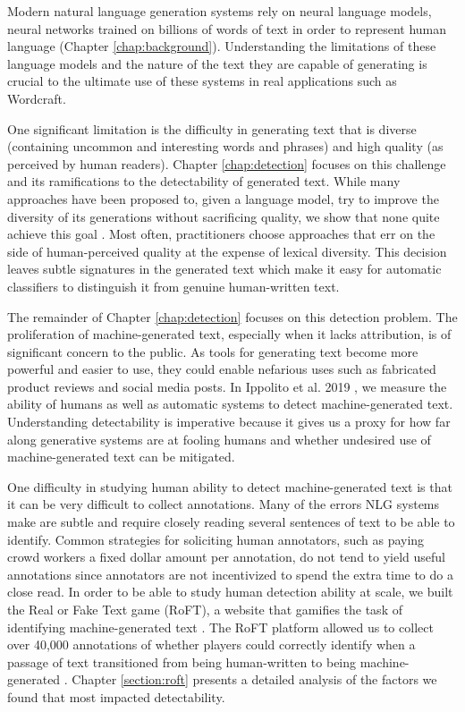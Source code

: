 Modern natural language generation systems rely on neural language models, neural networks trained on billions of words of text in order to represent human language (Chapter \ref{chap:background}). 
Understanding the limitations of these language models and the nature of the text they are capable of generating is crucial to the ultimate use of these systems in real applications such as Wordcraft.

One significant limitation is the difficulty in generating text that is diverse (containing uncommon and interesting words and phrases) and high quality (as perceived by human readers).
Chapter \ref{chap:detection} focuses on this challenge and its ramifications to the detectability of generated text.
While many approaches have been proposed to, given a language model, try to improve the diversity of its generations without sacrificing quality, we show that none quite achieve this goal \citep{ippolito2019comparison}.
Most often, practitioners choose approaches that err on the side of human-perceived quality at the expense of lexical diversity.
This decision leaves subtle signatures in the generated text which make it easy for automatic classifiers to distinguish it from genuine human-written text.

The remainder of Chapter \ref{chap:detection} focuses on this detection problem.
The proliferation of machine-generated text, especially when it lacks attribution, is of significant concern to the public.
As tools for generating text become more powerful and easier to use, they could enable nefarious uses such as fabricated product reviews and social media posts.
In Ippolito et al. 2019 \citep{ippolito2020automatic}, we measure the ability of humans as well as automatic systems to detect machine-generated text.
Understanding detectability is imperative because it gives us a proxy for how far along generative systems are at fooling humans and whether undesired use of machine-generated text can be mitigated.

One difficulty in studying human ability to detect machine-generated text is that it can be very difficult to collect annotations.
Many of the errors NLG systems make are subtle and require closely reading several sentences of text to be able to identify.
Common strategies for soliciting human annotators, such as paying crowd workers a fixed dollar amount per annotation, do not tend to yield useful annotations since annotators are not incentivized to spend the extra time to do a close read.
In order to be able to study human detection ability at scale, we built the Real or Fake Text game (RoFT), a website that gamifies the task of identifying machine-generated text \citep{dugan2020roft}.
The RoFT platform allowed us to collect over 40,000 annotations of whether players could correctly identify when a passage of text transitioned from being human-written to being machine-generated .
Chapter \ref{section:roft} presents a detailed analysis of the factors we found that most impacted detectability. 
 

